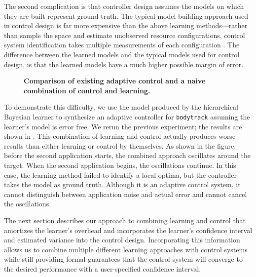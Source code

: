 The second complication is that controller design assumes the models
on which they are built represent ground truth.  The typical model
building approach used in control design is far more expensive than
the above learning methods---rather than sample the space and estimate
unobserved resource configurations, control system identification
takes multiple measurements of each configuration
\cite{ICSE2014,ControlHandbook}.  The difference between the learned
models and the typical models used for control design, is that the
learned models have a much higher possible margin of error.


\begin{figure}
\centering

\caption{\small \bf Comparison of existing adaptive control and a
  naive combination of control and learning.}
\label{fig:not-simple}
\end{figure}

To demonstrate this difficulty, we use the model produced by the
hierarchical Bayesian learner to synthesize an adaptive controller for
\texttt{bodytrack} assuming the learner's model is error free.  We
rerun the previous experiment; the results are shown in
.  This combination of learning and control
actually produces worse results than either learning or control by
themselves.  As shown in the figure, before the second application
starts, the combined approach oscillates around the target.  When the
second application begins, the oscillations continue.  In this case,
the learning method failed to identify a local optima, but the
controller takes the model as ground truth. Although it is an adaptive
control system, it cannot distinguish between application noise and
actual error and cannot cancel the oscillations.

The next section describes our approach to combining learning and
control that amortizes the learner's overhead and incorporates the
learner's confidence interval and estimated variance into the control
design. Incorporating this information allows us to combine multiple
different learning approaches with control systems while still
providing formal guarantees that the control system will converge to
the desired performance with a user-specified confidence interval.

